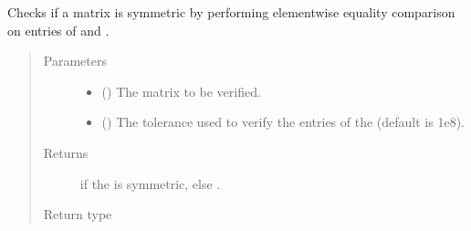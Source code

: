 \documentclass[letterpaper,10pt,english]{sphinxmanual}
\begin{document}
\begin{fulllineitems}
\label{\detokenize{app.domain.helpers:app.domain.helpers.matrices.is_symmetric}}
Checks if a matrix is symmetric by performing element\sphinxhyphen{}wise equality
comparison on entries of  and  .
\begin{quote}\begin{description}
\item[{Parameters}] \leavevmode\begin{itemize}
\item {} 
 () \textendash{} The matrix to be verified.

\item {} 
 () \textendash{} The tolerance used to verify the entries of the  (default
is 1e\sphinxhyphen{}8).

\end{itemize}

\item[{Returns}] \leavevmode
{} if the  is symmetric, else .

\item[{Return type}] \leavevmode
{}

\end{description}\end{quote}

\end{fulllineitems}

\end{document}
